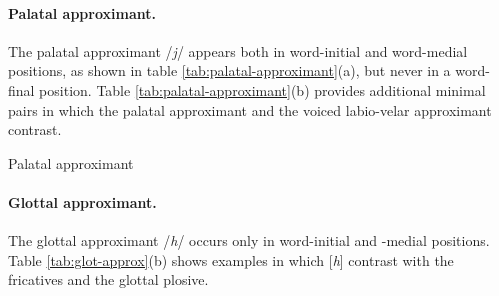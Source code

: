 \paragraph{Palatal approximant.}
The palatal approximant /{\it j}/  appears both in word-initial and word-medial
positions, as shown in table  \ref{tab:palatal-approximant}(a),   but never in a
word-final position.   Table
\ref{tab:palatal-approximant}(b) provides additional minimal pairs in which the
palatal approximant and the voiced labio-velar approximant contrast.


\begin{table}[!htb] \small
\centering
\caption{Palatal approximant\label{tab:palatal-approximant}}
\quad
{}


\end{table}



\paragraph{Glottal approximant.}
\label{sec:glot-approx}

The glottal approximant   /{\it h}/  
occurs only in word-initial and -medial positions.
Table \ref{tab:glot-approx}(b) shows examples in which [\textit{h}]
contrast with the fricatives and the glottal plosive.



